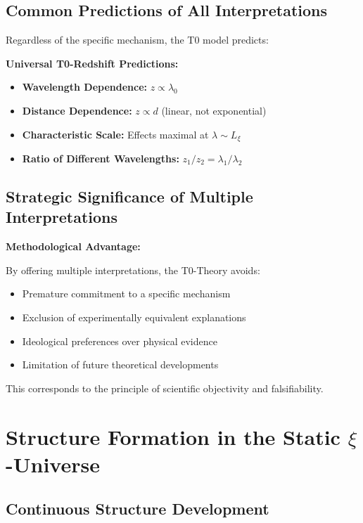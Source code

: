 \documentclass[12pt,a4paper]{article}
\newcommand{\Lxi}{L_\xi}
\begin{document}
	\subsection{Common Predictions of All Interpretations}
	
	Regardless of the specific mechanism, the T0 model predicts:
	
	\begin{keyresult}
		\textbf{Universal T0-Redshift Predictions:}
		
		\begin{itemize}
			\item \textbf{Wavelength Dependence:} $z \propto \lambda_0$
			\item \textbf{Distance Dependence:} $z \propto d$ (linear, not exponential)
			\item \textbf{Characteristic Scale:} Effects maximal at $\lambda \sim \Lxi$
			\item \textbf{Ratio of Different Wavelengths:} $z_1/z_2 = \lambda_1/\lambda_2$
		\end{itemize}
	\end{keyresult}
	
	\subsection{Strategic Significance of Multiple Interpretations}
	
	\begin{warning}
		\textbf{Methodological Advantage:}
		
		By offering multiple interpretations, the T0-Theory avoids:
		\begin{itemize}
			\item Premature commitment to a specific mechanism
			\item Exclusion of experimentally equivalent explanations
			\item Ideological preferences over physical evidence
			\item Limitation of future theoretical developments
		\end{itemize}
		
		This corresponds to the principle of scientific objectivity and falsifiability.
	\end{warning}	
	\section{Structure Formation in the Static $\xi$-Universe}
	
	\subsection{Continuous Structure Development}
	
\end{document}
